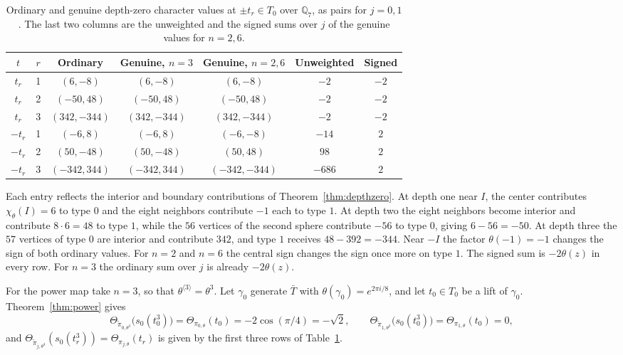 \documentclass[12pt,letterpaper]{article}
\numberwithin{equation}{section}
\theoremstyle{definition}
\theoremstyle{remark}
\begin{document}
\begin{table}[ht]
\centering
\caption{Ordinary and genuine depth-zero character values at $\pm t_r\in T_0$ over $\mathbb Q_7$, as pairs for $j=0,1$. The last two columns are the unweighted and the signed sums over $j$ of the genuine values for $n=2,6$.}\label{tab:Q7}
\vspace{4pt}
\small
\begin{tabular}{@{}ccccccc@{}}
\toprule
$t$ & $r$ & Ordinary & Genuine, $n=3$ & Genuine, $n=2,6$ & Unweighted & Signed\\
\midrule
$t_r$ &1& $(6,-8)$ & $(6,-8)$ & $(6,-8)$ & $-2$ & $-2$\\
$t_r$ &2& $(-50,48)$ & $(-50,48)$ & $(-50,48)$ & $-2$ & $-2$\\
$t_r$ &3& $(342,-344)$ & $(342,-344)$ & $(342,-344)$ & $-2$ & $-2$\\
$-t_r$ &1& $(-6,8)$ & $(-6,8)$ & $(-6,-8)$ & $-14$ & $2$\\
$-t_r$ &2& $(50,-48)$ & $(50,-48)$ & $(50,48)$ & $98$ & $2$\\
$-t_r$ &3& $(-342,344)$ & $(-342,344)$ & $(-342,-344)$ & $-686$ & $2$\\
\bottomrule
\end{tabular}
\end{table}

Each entry reflects the interior and boundary contributions of Theorem~\ref{thm:depthzero}. At depth one near $I$, the center contributes $\chi_\theta(I)=6$ to type $0$ and the eight neighbors contribute $-1$ each to type $1$. At depth two the eight neighbors become interior and contribute $8\cdot6=48$ to type $1$, while the $56$ vertices of the second sphere contribute $-56$ to type $0$, giving $6-56=-50$. At depth three the $57$ vertices of type $0$ are interior and contribute $342$, and type $1$ receives $48-392=-344$. Near $-I$ the factor $\theta(-1)=-1$ changes the sign of both ordinary values. For $n=2$ and $n=6$ the central sign changes the sign once more on type $1$. The signed sum is $-2\theta(z)$ in every row. For $n=3$ the ordinary sum over $j$ is already $-2\theta(z)$.

For the power map take $n=3$, so that $\theta^{\langle3\rangle}=\theta^3$. Let $\gamma_0$ generate $\bar T$ with $\theta(\gamma_0)=e^{2\pi i/8}$, and let $t_0\in T_0$ be a lift of $\gamma_0$. Theorem~\ref{thm:power} gives
\[
 \Theta_{\widetilde\pi_{0,\theta^3}}\bigl(s_0(t_0^3)\bigr)=\Theta_{\pi_{0,\theta}}(t_0)=-2\cos(\pi/4)=-\sqrt2,\qquad
 \Theta_{\widetilde\pi_{1,\theta^3}}\bigl(s_0(t_0^3)\bigr)=\Theta_{\pi_{1,\theta}}(t_0)=0,
\]
and $\Theta_{\widetilde\pi_{j,\theta^3}}(s_0(t_r^3))=\Theta_{\pi_{j,\theta}}(t_r)$ is given by the first three rows of Table~\ref{tab:Q7}.
\end{document}

